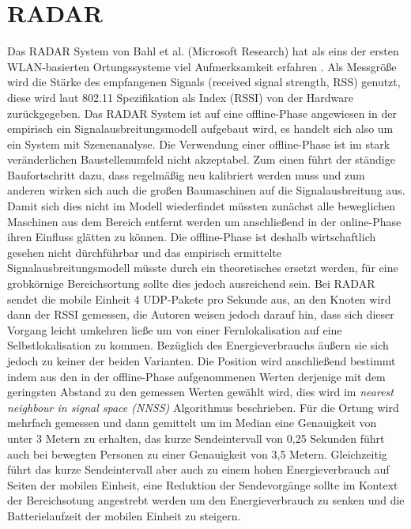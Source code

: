\section{RADAR}
\label{ch:Vorherige:sec:RADAR}
Das RADAR System von Bahl et al. (Microsoft Research) hat als eins der ersten WLAN-basierten Ortungssysteme viel Aufmerksamkeit erfahren \cite{bahl2000radar}.
Als Messgröße wird die Stärke des empfangenen Signals (received signal strength, RSS) genutzt, diese wird laut 802.11 Spezifikation als Index (RSSI) von der Hardware zurückgegeben. 
Das RADAR System ist auf eine offline-Phase angewiesen in der empirisch ein Signalausbreitungsmodell aufgebaut wird, es handelt sich also um ein System mit Szenenanalyse.
Die Verwendung einer offline-Phase ist im stark veränderlichen Baustellenumfeld nicht akzeptabel. 
Zum einen führt der ständige Baufortschritt dazu, dass regelmäßig neu kalibriert werden muss und zum anderen wirken sich auch die großen Baumaschinen auf die Signalausbreitung aus. 
Damit sich dies nicht im Modell wiederfindet müssten zunächst alle beweglichen Maschinen aus dem Bereich entfernt werden um anschließend in der online-Phase ihren Einfluss glätten zu können.
Die offline-Phase ist deshalb wirtschaftlich gesehen nicht dürchführbar und das empirisch ermittelte Signalausbreitungsmodell müsste durch ein theoretisches ersetzt werden, für eine grobkörnige Bereichsortung sollte dies jedoch ausreichend sein.
Bei RADAR sendet die mobile Einheit 4 UDP-Pakete pro Sekunde aus, an den Knoten wird dann der RSSI gemessen, die Autoren weisen jedoch darauf hin, dass sich dieser Vorgang leicht umkehren ließe um von einer Fernlokalisation auf eine Selbstlokalisation zu kommen.
Bezüglich des Energieverbrauchs äußern sie sich jedoch zu keiner der beiden Varianten.
Die Position wird anschließend bestimmt indem aus den in der offline-Phase aufgenommenen Werten derjenige mit dem geringsten Abstand zu den gemessen Werten gewählt wird, dies wird im \textit{nearest neighbour in signal space (NNSS)} Algorithmus beschrieben.
Für die Ortung wird mehrfach gemessen und dann gemittelt um im Median eine Genauigkeit von unter 3 Metern zu erhalten, das kurze Sendeintervall von 0,25 Sekunden führt auch bei bewegten Personen zu einer Genauigkeit von 3,5 Metern.
Gleichzeitig führt das kurze Sendeintervall aber auch zu einem hohen Energieverbrauch auf Seiten der mobilen Einheit, eine Reduktion der Sendevorgänge sollte im Kontext der Bereichsotung angestrebt werden um den Energieverbrauch zu senken und die Batterielaufzeit der mobilen Einheit zu steigern.

